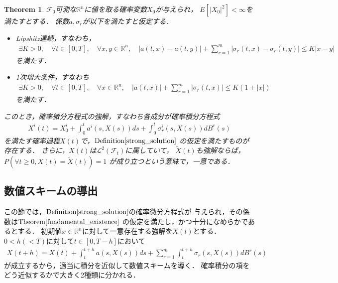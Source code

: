 \documentclass[dvipdfmx,autodetect-engine]{jsarticle}
\newtheorem{theorem}{Theorem}[section]
\theoremstyle{remark}
\theoremstyle{definition}
\newcommand{\R}{\mathbb{R}}
\newcommand{\abs}[1]{\left\lvert#1\right\rvert}
\begin{document}
\begin{theorem}\label{initial_random_existence}
    $\mathcal{F}_{0}$可測な$\R^{n}$に値を取る確率変数$X_{0}$が与えられ，
    $E[\abs{X_{0}}^{2}] < \infty$を満たすとする．
    係数$a,\sigma_{r}$が以下を満たすと仮定する．
    \begin{itemize}
        \item Lipshitz連続，すなわち，
        \begin{align}
            \exists K>0,\quad \forall t \in [0,T],\quad \forall x,y \in \R^{n},\quad
            \abs{a(t,x)-a(t,y)} + \sum_{r=1}^{m} \abs{\sigma_{r}(t,x) - \sigma_{r}(t,y)} 
            \leq K\abs{x-y}
        \end{align}
        を満たす．
        \item 1次増大条件，すなわち
        \begin{align}
            \exists K>0,\quad \forall t \in [0,T],\quad \forall x\in \R^{n},\quad
            \abs{a(t,x)} + \sum_{r=1}^{m} \abs{\sigma_{r}(t,x)} \leq K(1+\abs{x})
        \end{align}
        を満たす．
    \end{itemize}
    このとき，確率微分方程式の強解，すなわち各成分が確率積分方程式
    \begin{align}
        X^{i}(t) = X_{0}^{i} + \int_{0}^{t} a^{i}(s,X(s))ds +
         \int_{0}^{t} \sigma_{r}^{i}(s,X(s))dB^{r}(s)
    \end{align}
    を満たす確率過程$X(t)$で，$\mathrm{Definition}\ref{strong_solution}$
    の仮定を満たすものが存在する．
    さらに，$X(t)$は$\mathcal{L}^2 (\mathcal{F}_{t})$に属していて，
    $\tilde{X}(t)$も強解ならば，$P(\forall t \geq 0,X(t)=\tilde{X}(t))=1$
    が成り立つという意味で，一意である．
\end{theorem}


\subsection{数値スキームの導出}
この節では，$\mathrm{Definition}\ref{strong_solution}$の確率微分方程式が
与えられ，その係数は$\mathrm{Theorem}\ref{fundamental_existence}$
の仮定を満たし，かつ十分になめらかであるとする．
初期値$x \in \R^n$に対して一意存在する強解を$X(t)$とする．
$0<h(<T)$に対して$t \in [0,T-h]$において
\begin{align}
    X(t+h) = X(t) + \int_{t}^{t+h} a(s,X(s))ds + 
    \sum_{r=1}^{m} \int_{t}^{t+h} \sigma_{r}(s,X(s))dB^{r}(s)
\end{align}
が成立するから，適当に積分を近似して数値スキームを導く．
確率積分の項をどう近似するかで大きく2種類に分かれる．
\end{document}
